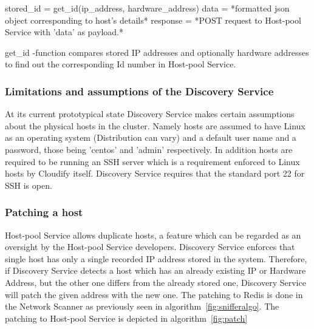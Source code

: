 \begin{algorithm}[H]
\label{fig:addhost}
\begin{center}
\end{center}
{
stored\_id = get\_id(ip\_address, hardware\_address)
 {
	data = *formatted json object corresponding to host's details*\;
	response = *POST request to Host-pool Service with 'data' as payload.*\;
} 
}

\caption{get\_id -function compares stored IP addresses and optionally hardware addresses to find out the corresponding Id number in Host-pool Service.}
\end{algorithm}

\subsubsection{Limitations and assumptions of the Discovery Service}

At its current prototypical state Discovery Service makes certain assumptions about the physical hosts in the cluster.
Namely hosts are assumed to have Linux as an operating system (Distribution can vary) and a default user name and a password, those being 'centos' and 'admin' respectively. In addition hosts are required to be running an SSH server which is a requirement enforced to Linux hosts by Cloudify itself. Discovery Service requires that the standard port 22 for SSH is open.

\subsubsection{Patching a host}

Host-pool Service allows duplicate hosts, a feature which can be regarded as an oversight by the Host-pool Service developers. Discovery Service enforces that single host has only a single recorded IP address stored in the system. Therefore, if Discovery Service detects a host which has an already existing IP or Hardware Address, but the other one differs from the already stored one, Discovery Service will patch the given address with the new one. The patching to Redis is done in the Network Scanner as previously seen in algorithm~\ref{fig:snifferalgo}. The patching to Host-pool Service is depicted in algorithm~\ref{fig:patch}

